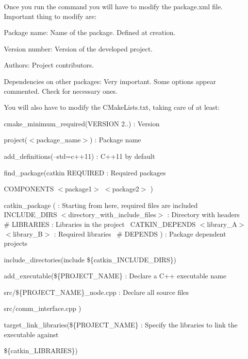 Once you run the command you will have to modify the package.\+xml file.~\newline
Important thing to modify are\+:~\newline
\begin{DoxyItemize}
\item Package name\+: Name of the package. Defined at creation. \item Version number\+: Version of the developed project. \item Authors\+: Project contributors. \item Dependencies on other packages\+: Very important. Some options appear commented. Check for necessary ones.\end{DoxyItemize}
You will also have to modify the C\+Make\+Lists.\+txt, taking care of at least\+:~\newline
\begin{DoxyItemize}
\item {\ttfamily cmake\+\_\+minimum\+\_\+required(V\+E\+R\+S\+I\+ON 2..)} \+: Version \item {\ttfamily project($<$package\+\_\+name$>$)} \+: Package name \item {\ttfamily add\+\_\+definitions(--std=c++11)} \+: C++11 by default \item {\ttfamily find\+\_\+package(catkin R\+E\+Q\+U\+I\+R\+ED} \+: Required packages \item {\ttfamily C\+O\+M\+P\+O\+N\+E\+N\+TS $<$package1$>$ $<$package2$>$ )} \item {\ttfamily catkin\+\_\+package (} \+: Starting from here, required files are included~\newline
 {\ttfamily I\+N\+C\+L\+U\+D\+E\+\_\+\+D\+I\+RS $<$directory\+\_\+with\+\_\+include\+\_\+files$>$} \+: Directory with headers~\newline
 {\ttfamily \# L\+I\+B\+R\+A\+R\+I\+ES} \+: Libraries in the project~\newline
 {\ttfamily C\+A\+T\+K\+I\+N\+\_\+\+D\+E\+P\+E\+N\+DS $<$library\+\_\+\+A$>$ $<$library\+\_\+\+B$>$} \+: Required libraries~\newline
 {\ttfamily \# D\+E\+P\+E\+N\+DS )} \+: Package dependent projects~\newline
\item {\ttfamily include\+\_\+directories(include \$\{catkin\+\_\+\+I\+N\+C\+L\+U\+D\+E\+\_\+\+D\+I\+RS\})} \item {\ttfamily add\+\_\+executable(\$\{P\+R\+O\+J\+E\+C\+T\+\_\+\+N\+A\+ME\}} \+: Declare a C++ executable name \item {\ttfamily src/\$\{P\+R\+O\+J\+E\+C\+T\+\_\+\+N\+A\+ME\}\+\_\+node.\+cpp} \+: Declare all source files \item {\ttfamily src/comm\+\_\+interface.\+cpp )} \item {\ttfamily target\+\_\+link\+\_\+libraries(\$\{P\+R\+O\+J\+E\+C\+T\+\_\+\+N\+A\+ME\}} \+: Specify the libraries to link the executable against \item {\ttfamily \$\{catkin\+\_\+\+L\+I\+B\+R\+A\+R\+I\+ES\})}\end{DoxyItemize}
